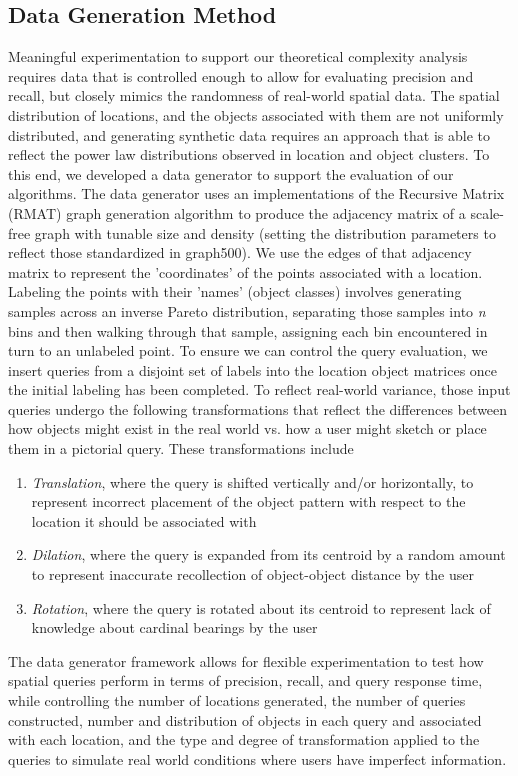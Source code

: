 \subsection{Data Generation Method}
\par{Meaningful experimentation to support our theoretical complexity analysis requires data that is controlled enough to allow for evaluating precision and recall, but closely mimics the randomness of real-world spatial data.
The spatial distribution of locations, and the objects associated with them are not uniformly distributed, and generating synthetic data requires an approach that is able to reflect the power law distributions observed in location and object clusters.  
To this end, we developed a data generator to support the evaluation of our algorithms. 
The data generator uses an implementations of the Recursive Matrix (RMAT) graph generation algorithm \cite{Chakrabarti2004} to produce the adjacency matrix of a scale-free graph with tunable size and density (setting the distribution parameters to reflect those standardized in graph500).
We use the edges of that adjacency matrix to represent the 'coordinates' of the points associated with a location. 
Labeling the points with their 'names' (object classes) involves generating samples across an inverse Pareto distribution, separating those samples into \textit{n} bins and then walking through that sample, assigning each bin encountered in turn to an unlabeled point.
To ensure we can control the query evaluation, we insert queries from a disjoint set of labels into the location object matrices once the initial labeling has been completed. 
To reflect real-world variance, those input queries undergo the following transformations that reflect the differences between how objects might exist in the real world vs. how a user might sketch or place them in a pictorial query.
These transformations include 
\begin{enumerate}
    \item \textit{Translation}, where the query is shifted vertically and/or horizontally, to represent incorrect placement of the object pattern with respect to the location it should be associated with
    \item \textit{Dilation}, where the query is expanded from its centroid by a random amount to represent inaccurate recollection of object-object distance by the user
    \item \textit{Rotation}, where the query is rotated about its centroid to represent lack of knowledge about cardinal bearings by the user
\end{enumerate}


The data generator framework allows for flexible experimentation to test how spatial queries perform in terms of precision, recall, and query response time, while controlling the number of locations generated, the number of queries constructed, number and distribution of objects in each query and associated with each location, and the type and degree of transformation applied to the queries to simulate real world conditions where users have imperfect information.}